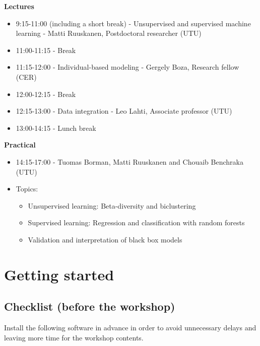 \documentclass[
  oneside]{book}
\begin{document}
\textbf{Lectures}

\begin{itemize}
\item
  9:15-11:00 (including a short break) - Unsupervised and supervised machine learning - Matti Ruuskanen, Postdoctoral researcher (UTU)
\item
  11:00-11:15 - Break
\item
  11:15-12:00 - Individual-based modeling - Gergely Boza, Research fellow (CER)
\item
  12:00-12:15 - Break
\item
  12:15-13:00 - Data integration - Leo Lahti, Associate professor (UTU)
\item
  13:00-14:15 - Lunch break
\end{itemize}

\textbf{Practical}

\begin{itemize}
\item
  14:15-17:00 - Tuomas Borman, Matti Ruuskanen and Chouaib Benchraka (UTU)
\item
  Topics:

  \begin{itemize}
  \item
    Unsupervised learning: Beta-diversity and biclustering
  \item
    Supervised learning: Regression and classification with random forests
  \item
    Validation and interpretation of black box models
  \end{itemize}
\end{itemize}

\hypertarget{getting-started}{%
\chapter{Getting started}\label{getting-started}}

\hypertarget{checklist-before-the-workshop}{%
\section{Checklist (before the workshop)}\label{checklist-before-the-workshop}}

Install the following software in advance in order to avoid
unnecessary delays and leaving more time for the workshop contents.
\end{document}
